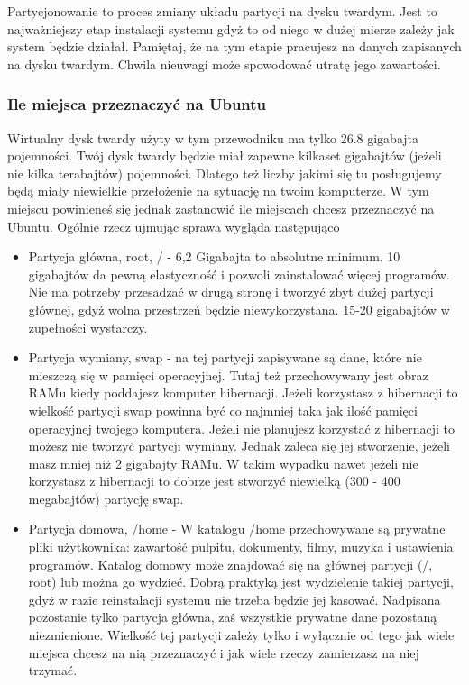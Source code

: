 \label{subsec:partycjonowanie}
Partycjonowanie to proces zmiany układu partycji na dysku twardym. Jest to najważniejszy etap instalacji systemu gdyż to od niego w dużej mierze zależy jak system będzie działał. Pamiętaj, że na tym etapie pracujesz na danych zapisanych na dysku twardym. Chwila nieuwagi może spowodować utratę jego zawartości.
\subsubsection{Ile miejsca przeznaczyć na Ubuntu}
\label{ile_miejsca}
Wirtualny dysk twardy użyty w tym przewodniku ma tylko 26.8 gigabajta pojemności. Twój dysk twardy będzie miał zapewne kilkaset gigabajtów (jeżeli nie kilka terabajtów) pojemności. Dlatego też liczby jakimi się tu posługujemy będą miały niewielkie przełożenie na sytuację na twoim komputerze. W tym miejscu powinieneś się jednak zastanowić ile miejscach chcesz przeznaczyć na Ubuntu.
Ogólnie rzecz ujmując sprawa wygląda następująco
\begin{itemize}
\item \textcolor{ubuntu_orange}{Partycja główna, root, /} - 6,2 Gigabajta to absolutne minimum. 10 gigabajtów da pewną elastyczność i pozwoli zainstalować więcej programów. Nie ma potrzeby przesadzać w drugą stronę i tworzyć zbyt dużej partycji głównej, gdyż wolna przestrzeń będzie niewykorzystana. 15-20 gigabajtów w zupełności wystarczy.
\item \textcolor{ubuntu_orange}{Partycja wymiany, swap} - na tej partycji zapisywane są dane, które nie mieszczą się w pamięci operacyjnej. Tutaj też przechowywany jest obraz RAMu kiedy poddajesz komputer hibernacji. Jeżeli korzystasz z hibernacji to wielkość partycji swap powinna być co najmniej taka jak ilość pamięci operacyjnej twojego komputera. Jeżeli nie planujesz korzystać z hibernacji to możesz nie tworzyć partycji wymiany. Jednak zaleca się jej stworzenie, jeżeli masz mniej niż 2 gigabajty RAMu. W takim wypadku nawet jeżeli nie korzystasz z hibernacji to dobrze jest stworzyć niewielką (300 - 400 megabajtów) partycję swap.
\item \textcolor{ubuntu_orange}{Partycja domowa, /home} - W katalogu /home przechowywane są prywatne pliki użytkownika: zawartość pulpitu, dokumenty, filmy, muzyka i ustawienia programów. Katalog domowy może znajdować się na głównej partycji (/, root) lub można go wydzieć. Dobrą praktyką jest wydzielenie takiej partycji, gdyż w razie reinstalacji systemu nie trzeba będzie jej kasować. Nadpisana pozostanie tylko partycja główna, zaś wszystkie prywatne dane pozostaną niezmienione. Wielkość tej partycji zależy tylko i wyłącznie od tego jak wiele miejsca chcesz na nią przeznaczyć i jak wiele rzeczy zamierzasz na niej trzymać. 
\end{itemize}
\clearpage
